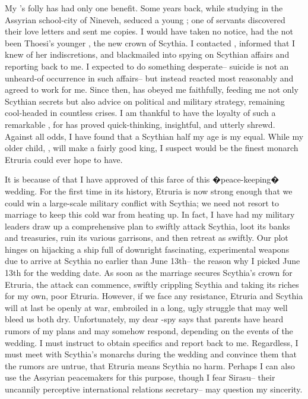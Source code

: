 \documentclass[char]{Kos}
\begin{document}
My \cPoet{\offspring}'s folly has had only one benefit. Some years back, while studying in the Assyrian school-city of Nineveh, \cPoet{\they} seduced a young \cBride{\human}; one of \cPoet{\their} servants discovered their love letters and sent me copies. I would have taken no notice, had the \cBride{\they} not been Thoesi's younger \cBride{\sibling}, the new crown \cBride{\prince} of Scythia. I contacted \cBride{\them}, informed \cBride{\them} that I knew of her indiscretions, and blackmailed \cBride{\them} into spying on Scythian affairs and reporting back to me. I expected \cBride{\them} to do something desperate-- suicide is not an unheard-of occurrence in such affairs-- but \cBride{\they} instead reacted most reasonably and agreed to work for me. Since then, \cBride{\they} has obeyed me faithfully, feeding me not only Scythian secrets but also advice on political and military strategy, remaining cool-headed in countless crises. I am thankful to have the loyalty of such a remarkable \cBride{\human}, for \cBride{\they} has proved \cBride{\themself} quick-thinking, insightful, and utterly shrewd. Against all odds, I have found that a Scythian \cBride{\prince} half my age is my equal. While my older child, \cGroom{}, will make a fairly good king, I suspect \cBride{\they} would be the finest monarch Etruria could ever hope to have.

It is because of \cBride{\them} that I have approved of this farce of this �peace-keeping� wedding. For the first time in its history, Etruria is now strong enough that we could win a large-scale military conflict with Scythia; we need not resort to marriage to keep this cold war from heating up. In fact, I have had my military leaders draw up a comprehensive plan to swiftly attack Scythia, loot its banks and treasuries, ruin its various garrisons, and then retreat as swiftly. Our plot hinges on hijacking a ship full of downright fascinating, experimental weapons due to arrive at Scythia no earlier than June 13th-- the reason why I picked June 13th for the wedding date. As soon as the marriage secures Scythia's crown \cBride{\prince} for Etruria, the attack can commence, swiftly crippling Scythia and taking its riches for my own, poor Etruria. However, if we face any resistance, Etruria and Scythia will at last be openly at war, embroiled in a long, ugly struggle that may well bleed us both dry. Unfortunately, my dear \cBride{\prince}-spy says that \cBride{\their} parents have heard rumors of my plans and may somehow respond, depending on the events of the wedding. I must instruct \cBride{\them} to obtain specifics and report back to me. Regardless, I must meet with Scythia's monarchs during the wedding and convince them that the rumors are untrue, that Etruria means Scythia no harm. Perhaps I can also use the Assyrian peacemakers for this purpose, though I fear Sirasu-- their uncannily perceptive international relations secretary-- may question my sincerity.
\end{document}
